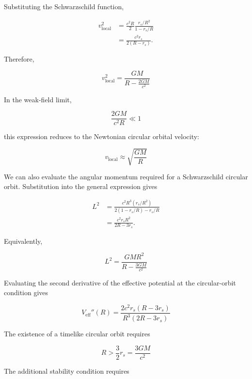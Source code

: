 \documentclass[pdflatex,sn-mathphys-num]{sn-jnl}%
\theoremstyle{thmstyleone}%
\theoremstyle{thmstyletwo}%
\theoremstyle{thmstylethree}%
\begin{document}
\begin{appendices}
Substituting the Schwarzschild function,

\begin{align}
v_{\mathrm{local}}^2
&=
\frac{c^2R}{2}
\frac{r_s/R^2}{1-r_s/R} \\
&=
\frac{c^2r_s}{2(R-r_s)}.
\end{align}

Therefore,

\begin{equation}
\boxed{
v_{\mathrm{local}}^2
=
\frac{GM}{R-\frac{2GM}{c^2}}
}
\end{equation}

In the weak-field limit,

\begin{equation}
\frac{2GM}{c^2R}\ll 1
\end{equation}

this expression reduces to the Newtonian circular orbital velocity:

\begin{equation}
v_{\mathrm{local}}
\approx
\sqrt{\frac{GM}{R}}
\end{equation}

We can also evaluate the angular momentum required for a Schwarzschild circular orbit. Substitution into the general expression gives

\begin{align}
L^2
&=
\frac{c^2R^3(r_s/R^2)}
{2(1-r_s/R)-r_s/R} \\
&=
\frac{c^2r_sR^2}{2R-3r_s}.
\end{align}

Equivalently,

\begin{equation}
\boxed{
L^2
=
\frac{GMR^2}{R-\frac{3GM}{c^2}}
}
\end{equation}

Evaluating the second derivative of the effective potential at the circular-orbit condition gives

\begin{equation}
\boxed{
V_{\mathrm{eff}}''(R)
=
\frac{2c^2r_s(R-3r_s)}
{R^3(2R-3r_s)}
}
\end{equation}

The existence of a timelike circular orbit requires

\begin{equation}
R>\frac{3}{2}r_s
=
\frac{3GM}{c^2}
\end{equation}

The additional stability condition requires


\end{appendices}
\end{document}
